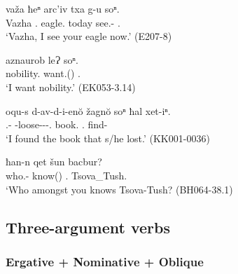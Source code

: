 \begin{exe}
	\ex\label{verbderiv-ex07}
	\begin{xlist}
		
		
			\ex\label{verbderiv-ex07a}
			\gll važa ħeⁿ arc'iv txa g-u soⁿ. \\
			Vazha {\Ssg}.{\Gen} eagle.\textbf{{\Nom}} today see.{\Pfv}-{\Npst} {\Fsg}.\textbf{{\Dat}}\\
			\trans `Vazha, I see your eagle now.'
			\hfill (E207-8)
		
		
		
			\ex\label{verbderiv-ex07b}
			\gll aznaurob leɁ soⁿ. \\
			nobility.\textbf{{\Nom}} want.{\Ipfv}({\Npst}) {\Fsg}.\textbf{{\Dat}} \\
			\trans `I want nobility.'
			\hfill (EK053-3.14)
		
		
		
			\ex\label{verbderiv-ex07c}
			\gll oqu-s d-av-d-i-en\u{o} žagn\u{o} soⁿ ħal xet-iⁿ.  \\
			{\Dist}.{\Obl}-{\Erg} {\D}-loose-{\D}-{\Tr}-{\Ptcp}.{\Pst} book.\textbf{{\Nom}} {\Fsg}.\textbf{{\Dat}} {\Pv} find-{\Aor} \\
			\trans `I found the book that s/he lost.'
			\hfill (KK001-0036)
		
		
		
			\ex\label{verbderiv-ex07d}
			\gll ħan-n qet šun bacbur?  \\
			who.{\Obl}-\textbf{{\Dat}} know({\Npst}) {\Spl}.{\Dat} Tsova\_Tush.\textbf{{\Nom}} \\
			\trans `Who amongst you knows Tsova-Tush?
			\hfill (BH064-38.1)
		
		
	\end{xlist}
\end{exe}



\subsection{Three-argument verbs} \label{3arg}

\subsubsection{Ergative + Nominative + Oblique}

